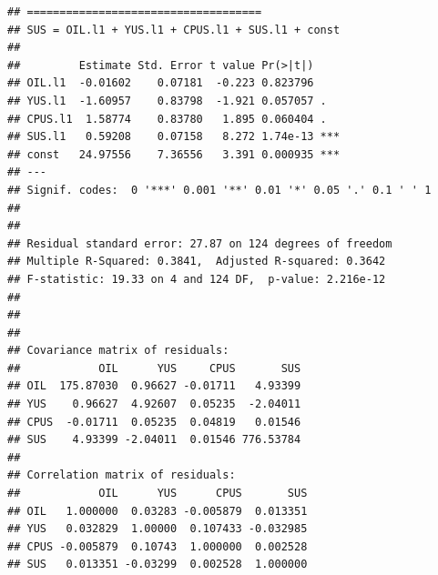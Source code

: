 \documentclass[11pt,preprint, authoryear]{elsarticle}
\numberwithin{equation}{section}
\numberwithin{figure}{section}
\numberwithin{table}{section}
\begin{document}
\begin{verbatim}
## ==================================== 
## SUS = OIL.l1 + YUS.l1 + CPUS.l1 + SUS.l1 + const 
## 
##         Estimate Std. Error t value Pr(>|t|)    
## OIL.l1  -0.01602    0.07181  -0.223 0.823796    
## YUS.l1  -1.60957    0.83798  -1.921 0.057057 .  
## CPUS.l1  1.58774    0.83780   1.895 0.060404 .  
## SUS.l1   0.59208    0.07158   8.272 1.74e-13 ***
## const   24.97556    7.36556   3.391 0.000935 ***
## ---
## Signif. codes:  0 '***' 0.001 '**' 0.01 '*' 0.05 '.' 0.1 ' ' 1
## 
## 
## Residual standard error: 27.87 on 124 degrees of freedom
## Multiple R-Squared: 0.3841,  Adjusted R-squared: 0.3642 
## F-statistic: 19.33 on 4 and 124 DF,  p-value: 2.216e-12 
## 
## 
## 
## Covariance matrix of residuals:
##            OIL      YUS     CPUS       SUS
## OIL  175.87030  0.96627 -0.01711   4.93399
## YUS    0.96627  4.92607  0.05235  -2.04011
## CPUS  -0.01711  0.05235  0.04819   0.01546
## SUS    4.93399 -2.04011  0.01546 776.53784
## 
## Correlation matrix of residuals:
##            OIL      YUS      CPUS       SUS
## OIL   1.000000  0.03283 -0.005879  0.013351
## YUS   0.032829  1.00000  0.107433 -0.032985
## CPUS -0.005879  0.10743  1.000000  0.002528
## SUS   0.013351 -0.03299  0.002528  1.000000
\end{verbatim}
\end{document}
